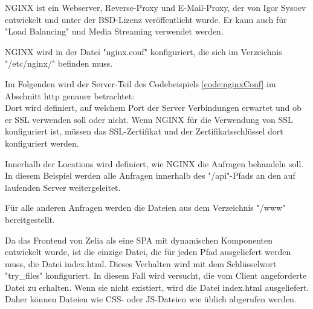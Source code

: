 

NGINX ist ein Webserver, Reverse-Proxy und E-Mail-Proxy, der von Igor Sysoev entwickelt und unter der BSD-Lizenz veröffentlicht wurde. Er kann auch für "Load Balancing" und Media Streaming verwendet werden.
\cite{WikiNginx}
\cite{nginx}

NGINX wird in der Datei "nginx.conf" konfiguriert, die sich im Verzeichnis \linebreak \mbox{"/etc/nginx/"} befinden muss. 


Im Folgenden wird der Server-Teil des Codebeispiels \ref{code:nginxConf} im Abschnitt http genauer betrachtet: \\
Dort wird definiert, auf welchem Port der Server Verbindungen erwartet und ob er SSL verwenden soll oder nicht. Wenn NGINX für die Verwendung von SSL konfiguriert ist, müssen das SSL-Zertifikat und der Zertifikatsschlüssel dort konfiguriert werden.

Innerhalb der Locations wird definiert, wie NGINX die Anfragen behandeln soll. In diesem Beispiel werden alle Anfragen innerhalb des "/api"-Pfads an den auf  laufenden Server weitergeleitet.

Für alle anderen Anfragen werden die Dateien aus dem Verzeichnis "/www" bereitgestellt. 

Da das Frontend von Zelia als eine SPA mit dynamischen Komponenten entwickelt wurde, ist die einzige Datei, die für jeden Pfad ausgeliefert werden muss, die Datei index.html. Dieses Verhalten wird mit dem Schlüsselwort "try\_files" konfiguriert. In diesem Fall wird versucht, die vom Client angeforderte Datei zu erhalten. Wenn sie nicht existiert, wird die Datei index.html ausgeliefert. Daher können Dateien wie CSS- oder JS-Dateien wie üblich abgerufen werden.

